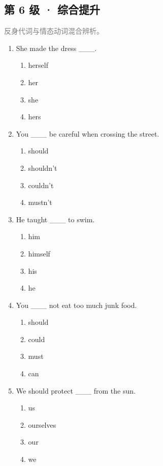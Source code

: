 \documentclass[11pt,a4paper]{ctexart}
\begin{document}
\subsection*{第 6 级 · 综合提升}
\noindent\textcolor{gray}{反身代词与情态动词混合辨析。}\par\smallskip
\begin{enumerate}[leftmargin=*,itemsep=4pt]
\item She made the dress \_\_\_.
\begin{enumerate}[label=\Alph*.,leftmargin=2em,itemsep=1pt,topsep=2pt]
\item herself
\item her
\item she
\item hers
\end{enumerate}
\item You \_\_\_ be careful when crossing the street.
\begin{enumerate}[label=\Alph*.,leftmargin=2em,itemsep=1pt,topsep=2pt]
\item should
\item shouldn’t
\item couldn’t
\item mustn’t
\end{enumerate}
\item He taught \_\_\_ to swim.
\begin{enumerate}[label=\Alph*.,leftmargin=2em,itemsep=1pt,topsep=2pt]
\item him
\item himself
\item his
\item he
\end{enumerate}
\item You \_\_\_ not eat too much junk food.
\begin{enumerate}[label=\Alph*.,leftmargin=2em,itemsep=1pt,topsep=2pt]
\item should
\item could
\item must
\item can
\end{enumerate}
\item We should protect \_\_\_ from the sun.
\begin{enumerate}[label=\Alph*.,leftmargin=2em,itemsep=1pt,topsep=2pt]
\item us
\item ourselves
\item our
\item we

\end{enumerate}
\end{enumerate}
\end{document}
